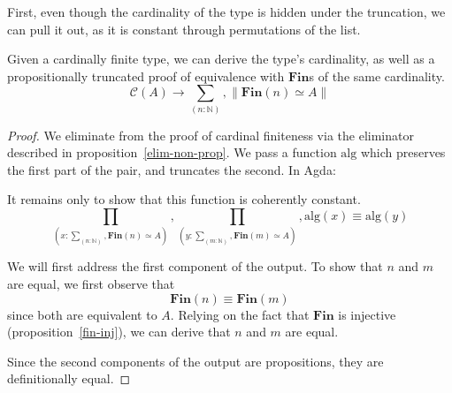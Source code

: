 First, even though the cardinality of the type is hidden under the truncation,
we can pull it out, as it is constant through permutations of the list.
\begin{rm-theorem}
  Given a cardinally finite type, we can derive the type's cardinality, as well
  as a propositionally truncated proof of equivalence with \(\textbf{Fin}\)s of
  the same cardinality.
  \begin{equation}
    \mathcal{C}(A) \rightarrow \sum_{(n : \mathbb{N})} , \lVert \textbf{Fin}(n) \simeq A \rVert
  \end{equation}
\end{rm-theorem}
\begin{proof}
  We eliminate from the proof of cardinal finiteness via the eliminator
  described in proposition~\ref{elim-non-prop}.
  We pass a function \(\text{alg}\) which preserves the first part of the pair,
  and truncates the second.
  In Agda:

  It remains only to show that this function is coherently constant.
  \begin{equation}
    \prod_{(x : \sum_{(n : \mathbb{N})} , \textbf{Fin}(n) \simeq A)} ,
    \prod_{(y : \sum_{(m : \mathbb{N})} , \textbf{Fin}(m) \simeq A)} ,
    \text{alg}(x) \equiv \text{alg}(y)
  \end{equation}

  We will first address the first component of the output.
  To show that \(n\) and \(m\) are equal, we first observe that
  \begin{equation}
    \textbf{Fin}(n) \equiv \textbf{Fin}(m)
  \end{equation}
  since both are equivalent to \(A\).
  Relying on the fact that \(\textbf{Fin}\) is injective
  (proposition~\ref{fin-inj}), we can derive that \(n\) and \(m\) are equal.

  Since the second components of the output are propositions, they are
  definitionally equal.
\end{proof}

